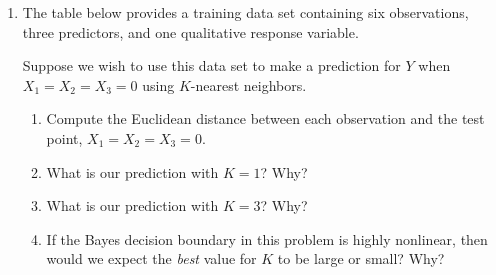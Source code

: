 \documentclass[12pt]{article}
\begin{document}
\begin{enumerate}
\item The table below provides a training data set containing six observations,
      three predictors, and one qualitative response variable.

      Suppose we wish to use this data set to make a prediction for $Y$ when
      $X_1 = X_2 = X_3 = 0$ using $K$-nearest neighbors.
  \begin{enumerate}
    \item Compute the Euclidean distance between each observation and the test
          point, $X_1 = X_2 = X_3 = 0$.
    \item What is our prediction with $K = 1$? Why?
    \item What is our prediction with $K = 3$? Why?
    \item If the Bayes decision boundary in this problem is highly nonlinear,
          then would we expect the \textit{best} value for $K$ to be large or
          small? Why?
  \end{enumerate}
\end{enumerate}
\end{document}
